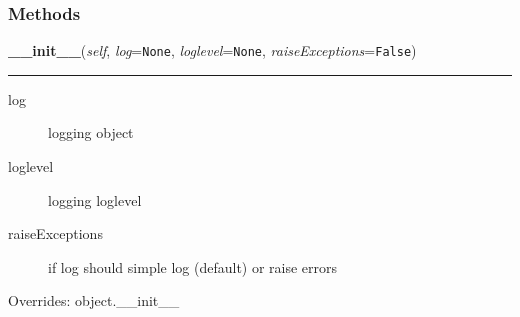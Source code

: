 
  \subsubsection{Methods}

    \vspace{0.5ex}

\hspace{.8\funcindent}\begin{boxedminipage}{\funcwidth}

    \raggedright \textbf{\_\_init\_\_}(\textit{self}, \textit{log}={\tt None}, \textit{loglevel}={\tt None}, \textit{raiseExceptions}={\tt False})

    \vspace{-1.5ex}

    \rule{\textwidth}{0.5\fboxrule}
\setlength{\parskip}{2ex}
\begin{description}
\item[{log}] \leavevmode 
logging object

\item[{loglevel}] \leavevmode 
logging loglevel

\item[{raiseExceptions}] \leavevmode 
if log should simple log (default) or raise errors

\end{description}
\setlength{\parskip}{1ex}
      Overrides: object.\_\_init\_\_

    \end{boxedminipage}

    \label{cssutils:parse':CSSParser:parseString}

    \vspace{0.5ex}

